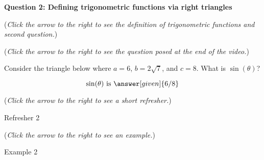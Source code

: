 \documentclass{ximera}
\begin{document}
\textbf{Question 2: Defining trigonometric functions via right triangles}
\begin{question}
\begin{flushright}
{\color{blue}(\emph{Click the arrow to the right to see the definition
of trigonometric functions and second question.})}
\end{flushright}
\begin{center}
\begin{expandable}
{\color{blue}(\emph{Click the arrow to the right to see the question
posed at the end of the video.})}
\begin{expandable}
\begin{center}
\end{center}
Consider the triangle below where $a = 6$, $b=2\sqrt{7}$,
and $c=8$. What is $\sin( \theta)$?\\
\begin{prompt}
\[
\sin(\theta)\text{ is }\answer[given]{6/8}
\]
\end{prompt}
\begin{flushright}
{\color{blue}(\emph{Click the arrow to the right to see a short refresher.})}
\end{flushright}
\begin{expandable}
Refresher 2
\end{expandable}
\begin{flushright}
{\color{blue}(\emph{Click the arrow to the right to see an example.})}
\end{flushright}
\begin{expandable}
Example 2
\end{expandable}
\end{expandable}
\end{expandable}
\end{center}
\end{question}
\end{document}

